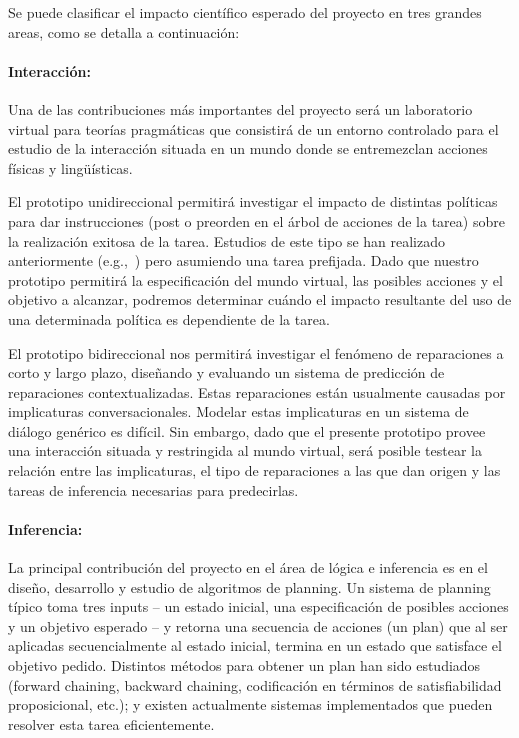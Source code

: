 
Se puede clasificar el impacto cient\'ifico
esperado del proyecto en tres grandes areas, como se detalla a continuaci\'on:

\paragraph{Interacci\'on:}
Una de las contribuciones m\'as
importantes del proyecto ser\'a un laboratorio virtual para
teor\'ias pragm\'aticas que consistir\'a de un
entorno controlado para el estudio de la interacci\'on situada en un mundo donde
se entremezclan acciones f\'isicas y ling\"u\'isticas.

El prototipo unidireccional permitir\'a
investigar el impacto de distintas
pol\'iticas para dar instrucciones (post o
preorden en el \'arbol de acciones de la tarea)
sobre la realizaci\'on exitosa de la tarea.
Estudios de este tipo se han realizado anteriormente
(e.g.,~\cite{foster-etal-ijcai2009}) pero
asumiendo una tarea prefijada.
Dado que nuestro prototipo permitir\'a la especificaci\'on
del mundo virtual, las posibles acciones y el objetivo
a alcanzar, podremos determinar cu\'ando el impacto resultante
del uso de una determinada pol\'itica
es dependiente de la tarea.

El prototipo bidireccional nos permitir\'a investigar el
fen\'omeno de reparaciones a corto y largo plazo,
dise\~nando y evaluando un sistema de predicci\'on de reparaciones
contextualizadas.  Estas reparaciones est\'an usualmente
causadas por implicaturas conversacionales.  Modelar
estas implicaturas en un sistema de di\'alogo gen\'erico
es dif\'icil.  Sin embargo, dado que el presente prototipo provee una
interacci\'on situada
y restringida al mundo virtual, ser\'a posible testear la relaci\'on entre
las implicaturas, el tipo de reparaciones a las que
dan origen y las tareas de inferencia necesarias para
predecirlas.

\paragraph{Inferencia:} La principal contribuci\'on del
proyecto en el \'area de l\'ogica e inferencia es en el
dise\~no, desarrollo y estudio de algoritmos de planning.
Un sistema de planning t\'ipico toma tres inputs -- un
estado inicial, una especificaci\'on de posibles acciones y
un objetivo esperado -- y retorna una secuencia de acciones (un plan)
que al ser aplicadas secuencialmente al estado inicial, termina
en un estado que satisface el objetivo pedido.  Distintos
m\'etodos para obtener un plan han sido estudiados (forward chaining, backward
chaining, codificaci\'on en t\'erminos de satisfiabilidad proposicional, etc.); y existen actualmente sistemas
implementados que pueden resolver esta tarea eficientemente.

